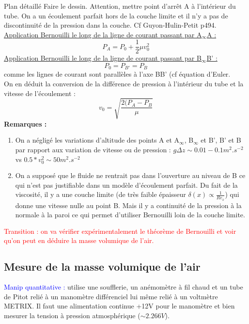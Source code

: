 \begin{reportBlock}{Plan détaillé}
Faire le dessin. Attention, mettre point d'arrêt A à l'intérieur du tube. On a un écoulement parfait hors de la couche limite et il n'y a pas de discontinuité de la pression dans la couche. Cf Guyon-Hulin-Petit p494.\\

\underline{Application Bernouilli le long de la ligne de courant passant par A$_{\infty}$A :}
\begin{equation}
    P_A = P_0 + \frac{1}{2}\mu v_0^2
\end{equation}
\underline{Application Bernouilli le long de la ligne de courant passant par B$_{\infty}$B' :}
\begin{equation}
    P_{0} = P_{B'} = P_B
\end{equation}
comme les lignes de courant sont parallèles à l'axe BB' (cf équation d'Euler.\\

On en déduit la conversion de la différence de pression à l'intérieur du tube et la vitesse de l'écoulement :
\begin{equation}
    v_0 = \sqrt{\frac{2(P_A-P_B}{\mu}}
\end{equation}
\textbf{Remarques :}
\begin{enumerate}
    \item On a négligé les variations d'altitude des points A et A$_{\infty}$, B$_{\infty}$ et B', B' et B par rapport aux variation de vitesse ou de pression : $g\Delta z\sim 0.01-0.1m^2.s^{-2}$ vs $0.5*v_0^2\sim 50m^2.s^{-2}$
    \item On a supposé que le fluide ne rentrait pas dans l'ouverture au niveau de B ce qui n'est pas justifiable dans un modèle d'écoulement parfait. Du fait de la viscosité, il y a une couche limite (de très faible épaisseur $\delta(x)\propto\frac{1}{Re_x}$) qui donne une vitesse nulle au point B. Mais il y a continuité de la pression à la normale à la paroi ce qui permet d'utiliser Bernouilli loin de la couche limite.
\end{enumerate}

\textcolor{red}{Transition : on va vérifier expérimentalement le théorème de Bernouilli et voir qu'on peut en déduire la masse volumique de l'air.}

\subsection{Mesure de la masse volumique de l'air}

\textcolor{blue}{Manip quantitative :} utilise une soufflerie, un anémomètre à fil chaud et un tube de Pitot relié à un manomètre différenciel lui même relié à un voltmètre METRIX. Il faut une alimentation continue +12V pour le manomètre et bien mesurer la tension à pression atmosphérique ($\sim 2.266V$).\\


\end{reportBlock}
